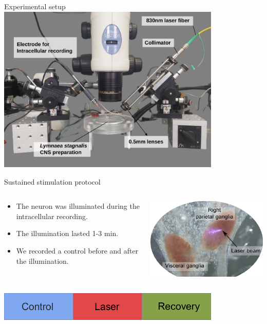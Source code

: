 \documentclass[aspectratio=43]{beamer}
\begin{document}
\begin{frame}{Experimental setup}
	\centering
	\includegraphics[width=0.8\textwidth]{methods/laser-setup_labels.png}
\end{frame}

\begin{frame}{Sustained stimulation protocol}
	\begin{columns}
		\begin{column}{0.65\textwidth}
			\begin{itemize}
				\item {The neuron was illuminated during the intracellular recording.}
				\item {The illumination lasted 1-3 min.}
				\item {We recorded a control before and after the illumination.}
			\end{itemize}
		\end{column}
		\begin{column}{0.35\textwidth}
			\includegraphics[width=\textwidth]{laser/laser-beam.pdf}
		\end{column}
	\end{columns} 
	\vspace{15pt}
	\centering
	\includegraphics[width=0.8\textwidth]{laser/trial-protocol.pdf}
\end{frame}
\end{document}
